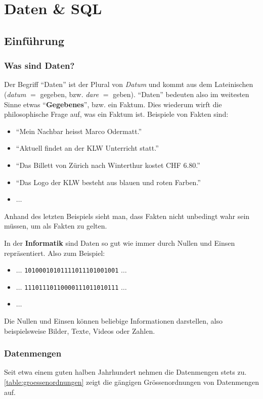 \chapter{Daten \& SQL}\label{ch:Lektion}
\section{Einführung}

\subsection{Was sind Daten?}

Der Begriff \enquote{Daten} ist der Plural von \textit{Datum} und kommt aus dem Lateinischen (\textit{datum} $=$ gegeben,
bzw. \textit{dare} $=$ geben). \enquote{Daten} bedeuten also im weitesten Sinne etwas \enquote{\textbf{Gegebenes}}, bzw. ein Faktum. Dies wiederum wirft die philosophische Frage auf, was ein Faktum ist. Beispiele von Fakten sind:
\begin{itemize}
  \item \enquote{Mein Nachbar heisst Marco Odermatt.}
  \item \enquote{Aktuell findet an der KLW Unterricht statt.}
  \item \enquote{Das Billett von Zürich nach Winterthur kostet CHF 6.80.}
  \item \enquote{Das Logo der KLW besteht aus blauen und roten Farben.}
  \item $\ldots$
\end{itemize}
Anhand des letzten Beispiels sieht man, dass Fakten nicht unbedingt wahr sein müssen, um als Fakten zu gelten.

In der \textbf{Informatik} sind Daten so gut wie immer durch Nullen und Einsen repräsentiert. Also zum Beispiel:
\begin{itemize}
  \item $\ldots$ \verb|10100010101111011101001001| $\ldots$
  \item $\ldots$ \verb|11101110110000111011010111| $\ldots$
  \item $\ldots$
\end{itemize}
Die Nullen und Einsen können beliebige Informationen darstellen, also beispielsweise Bilder, Texte, Videos oder Zahlen.

\subsection{Datenmengen}
Seit etwa einem guten halben Jahrhundert nehmen die Datenmengen stets zu. \cref{table:groessenordnungen} zeigt die gängigen Grössenordnungen von Datenmengen auf.


